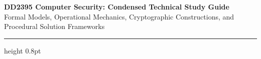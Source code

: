 \documentclass[9pt, a4paper]{extarticle}
\begin{document}
\begin{center}
  {\LARGE\bfseries\color{navy} DD2395 Computer Security: Condensed Technical Study Guide}\\[3pt]
  {\footnotesize Formal Models, Operational Mechanics, Cryptographic Constructions, and Procedural Solution Frameworks}
\end{center}
\vspace{-4pt}
\hrule height 0.8pt
\vspace{4pt}












\end{document}
